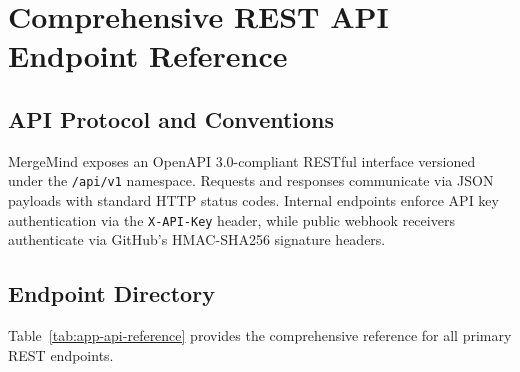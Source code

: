 \documentclass[12pt,a4paper,oneside]{report}
\begin{document}
\cleardoublepage

\chapter{Comprehensive REST API Endpoint Reference}
\label{app:api-reference}

\section{API Protocol and Conventions}

MergeMind exposes an OpenAPI 3.0-compliant RESTful interface versioned under the \texttt{/api/v1} namespace. Requests and responses communicate via JSON payloads with standard HTTP status codes. Internal endpoints enforce API key authentication via the \texttt{X-API-Key} header, while public webhook receivers authenticate via GitHub's HMAC-SHA256 signature headers.

\section{Endpoint Directory}

Table~\ref{tab:app-api-reference} provides the comprehensive reference for all primary REST endpoints.
\end{document}
